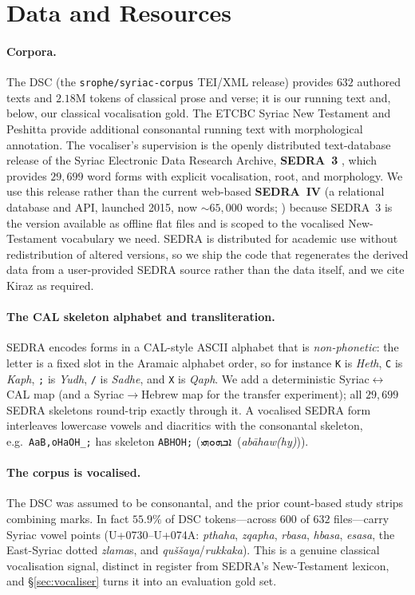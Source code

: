 \documentclass[11pt]{article}
\providecommand{\syriacfont}{}            %
\providecommand{\RL}[1]{#1}               %
\newcommand{\syrscript}[1]{{\syriacfont\RL{#1}}}
\newcommand{\syrt}[2]{\syrscript{#1}~(\textit{#2})}
\newcommand{\cal}[1]{\texttt{#1}}         %
\begin{document}
\section{Data and Resources}
\label{sec:data}

\paragraph{Corpora.}
The DSC (the \texttt{srophe/syriac-corpus} TEI/XML release) provides $632$
authored texts and $2.18$M tokens of classical prose and verse; it is our running
text and, below, our classical vocalisation gold. The ETCBC Syriac New Testament
and Peshitta \citep{etcbcsyriac} provide additional consonantal running text with
morphological annotation. The vocaliser's supervision is the openly distributed
text-database release of the Syriac Electronic Data Research Archive,
\textbf{SEDRA~3} \citep{kiraz1994sedra}, which provides $29{,}699$ word forms with
explicit vocalisation, root, and morphology. We use this release rather than the
current web-based \textbf{SEDRA~IV} (a relational database and API, launched 2015,
now $\sim$$65{,}000$ words; \citealp{sedraproject}) because SEDRA~3 is the version
available as offline flat files and is scoped to the vocalised New-Testament
vocabulary we need. SEDRA is distributed for academic use without
redistribution of altered versions, so we ship the code that regenerates the
derived data from a user-provided SEDRA source rather than the data itself, and we
cite Kiraz as required.

\paragraph{The CAL skeleton alphabet and transliteration.}
SEDRA encodes forms in a CAL-style ASCII alphabet that is \emph{non-phonetic}: the
letter is a fixed slot in the Aramaic alphabet order, so for instance \cal{K} is
\emph{Heth}, \cal{C} is \emph{Kaph}, \cal{;} is \emph{Yudh}, \cal{/} is
\emph{Sadhe}, and \cal{X} is \emph{Qaph}. We add a deterministic Syriac$\leftrightarrow$CAL
map (and a Syriac$\to$Hebrew map for the transfer experiment); all $29{,}699$
SEDRA skeletons round-trip exactly through it. A vocalised SEDRA form interleaves
lowercase vowels and diacritics with the consonantal skeleton, e.g.\
\cal{AaB,oHaOH\_;} has skeleton \cal{ABHOH;} (\syrt{ܐܒܗܘܗܝ}{abāhaw(hy)}).

\paragraph{The corpus is vocalised.}
The DSC was assumed to be consonantal, and the prior count-based study strips
combining marks. In fact $55.9\%$ of DSC tokens---across $600$ of $632$
files---carry Syriac vowel points (U+0730--U+074A: \emph{pthaha}, \emph{zqapha},
\emph{rbasa}, \emph{hbasa}, \emph{esasa}, the East-Syriac dotted \emph{zlama}s,
and \emph{qu\v{s}\v{s}aya}/\emph{rukkaka}). This is a genuine classical
vocalisation signal, distinct in register from SEDRA's New-Testament lexicon, and
\S\ref{sec:vocaliser} turns it into an evaluation gold set.
\end{document}
